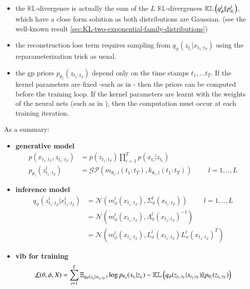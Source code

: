 \begin{itemize}
    \item the $\mathbb{KL}$-divergence is actually the sum of the $L$ $\mathbb{KL}$-divergences $\mathbb{KL}\left( q_{\phi}^l \vert\vert p_{\theta_z}^l \right)$, which have a close form solution as both distributions are Gaussian. (see the well-known result \ref{sec:KL-two-exponential-family-distributions})
    \item the reconstruction loss term requires sampling from $q_{\phi}(z_{t_i} \vert x_{t_1:t_T})$ using the reparameterization trick as usual.
    \item the \gls{gp} priors $p_{\theta_z}(z_{t_1:t_T})$ depend only on the time stamps $t_1,...t_T$. If the kernel parameters are fixed -such as in \cite{fortuin_gp-vae:_2020}- then the priors can be computed before the training loop. If the kernel parameters are learnt with the weights of the neural nets (such as in \cite{zhu_markovian_2023}), then the computation must occur at each training iteration.
\end{itemize}

As a summary:
\begin{tcolorbox}[colback=blue!5!white,colframe=black!75!black,title=Gaussian Process VAEs]
\begin{itemize}
    \item \textbf{generative model}
    \begin{align}
        \label{gen_model_gpvae}
        p(x_{t_1:t_T}, z_{t_1:t_T}) &= p(z_{t_1:t_T}) \prod_{i=1}^T p(x_{t_i} \vert z_{t_{i}}) \\
        p_{\theta_z}(z_{t_1:t_T}^l) &= \mathcal{GP}(m_{\theta_z, l}(t_1:t_T), k_{\theta_z, l}(t_1:t_T)) \hspace{1cm} l=1,..,L
    \end{align}
    \item \textbf{inference model}
    \begin{align}
        \label{inf_model_gpvae}
        q_\phi(z_{t_1:t_T}^l \vert x_{t_1:t_T}^l) &= \mathcal{N}(m_{\phi}^l(x_{t_1:t_T}), \Sigma_{\phi}^l(x_{t_1:t_T})) \hspace{1cm} l=1,..,L \\
        &= \mathcal{N}(m_{\phi}^l(x_{t_1:t_T}), \Lambda_{\phi}^l(x_{t_1:t_T})^{-1}) \\
        &= \mathcal{N}(m_{\phi}^l(x_{t_1:t_T}), L_{\phi}^l(x_{t_1:t_T})L_{\phi}^l(x_{t_1:t_T})^T)
    \end{align}
    \item \textbf{\gls{vlb} for training}
    \begin{align}
        \label{vlb_gpvae}
        \mathcal{L}(\theta, \phi, X) = \sum_{i=1}^T \mathbb{E}_{q_{\phi}(z_{t_i} \vert x_{t_1:t_T})} \log{p_{\theta_x}(x_{t_i} \vert z_{t_i})} - \mathbb{KL}\left( q_{\phi}(z_{t_1:t_T} \vert x_{t_1:t_T}) \vert\vert p_{\theta_z}(z_{t_1:t_T}) \right) 
    \end{align}
\end{itemize}
\end{tcolorbox}

